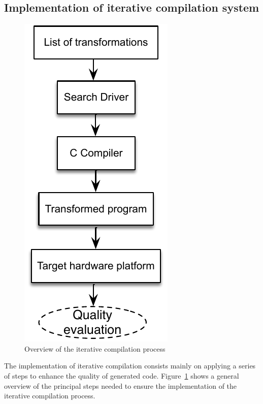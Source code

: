 \subsection{Implementation of iterative compilation system}
\begin{figure}[h]
	\center
	\includegraphics[scale=0.65]{SOTA/fig/iterative_compilation}
	\caption{Overview of the iterative compilation process}
	\label{fig:iterative_compilation}
\end{figure}
The implementation of iterative compilation consists mainly on applying a series of steps to enhance the quality of generated code. Figure~\ref{fig:iterative_compilation} shows a general overview of the principal steps needed to ensure the implementation of the iterative compilation process.
